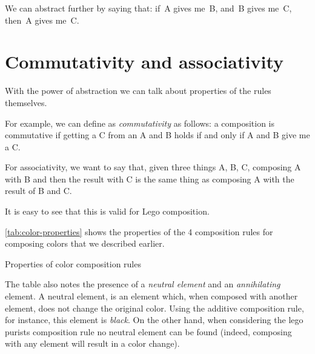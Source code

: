 



We can abstract further by saying that: if~A gives me~B, and~B gives me~C, then~A gives me~C.



\section{Commutativity and associativity}

With the power of abstraction we can talk about properties of the rules themselves.

For example, we can define as \emph{commutativity} as follows: a composition is commutative if getting a C from an A and B holds if and only if A and B give me a C.


For associativity, we want to say that, given three things A, B, C, composing A with B and then the result with C is the same thing as composing A with the result of B and C.

 
It is easy to see that this is valid for Lego composition.



\cref{tab:color-properties} shows the properties of the 4 composition rules for composing colors that we described earlier.

\begin{table*}[p]
    \caption{Properties of color composition rules}
    \label{tab:color-properties}
\end{table*}

The table also notes the presence of a \emph{neutral element} and an \emph{annihilating} element.
A neutral element, is an element which, when composed with another element, does not change the original color.
Using the additive composition rule, for instance, this element is \emph{black}.
On the other hand, when considering the lego purists composition rule no neutral element can be found (indeed, composing with any element will result in a color change).


